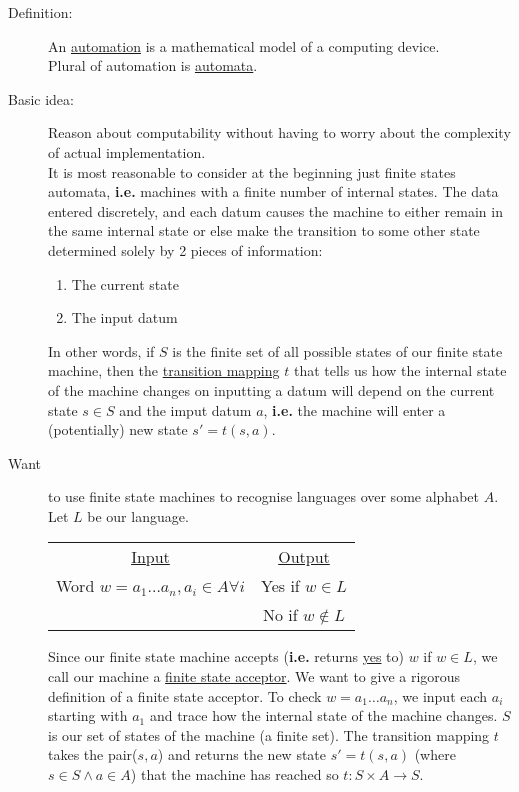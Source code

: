 \documentclass[10pt]{article}
\begin{document}
	\begin{description}
		\item[Definition:] An \underline{automation} is a mathematical model of a computing device. \\
		Plural of automation is \underline{automata}.
		\item[Basic idea:] Reason about computability without having to worry about the complexity of actual implementation. \\
		It is most reasonable to consider at the beginning just finite states automata, \textbf{i.e.} machines with a finite number of internal states. The data entered discretely, and each datum causes the machine to either remain in the same internal state or else make the transition to some other state determined solely by 2 pieces of information:
		\begin{enumerate}
			\item The current state
			\item The input datum
		\end{enumerate}
		In other words, if $S$ is the finite set of all possible states of our finite state machine, then the \underline{transition mapping} $t$ that tells us how the internal state of the machine changes on inputting a datum will depend on the current state $s \in S$ and the imput datum $a$, \textbf{i.e.} the machine will enter a (potentially) new state $s' = t(s, a)$.
		\item[Want] to use finite state machines to recognise languages over some alphabet $A$. Let $L$ be our language.\\
		\begin{table}[h!]
			\centering
			\begin{tabular}{cc}
				\underline{Input} & \underline{Output} \\
				Word $w=a_1\dots a_n, a_i \in A \forall i$ & Yes if $w \in L$ \\
				& No if $w \notin L$
			\end{tabular}
		\end{table}
		Since our finite state machine accepts (\textbf{i.e.} returns \underline{yes} to) $w$ if $w \in L$, we call our machine a \underline{finite state acceptor}. We want to give a rigorous definition of a finite state acceptor. To check $w=a_1 \dots a_n$, we input each $a_i$ starting with $a_1$ and trace how the internal state of the machine changes. $S$ is our set of states of the machine (a finite set). The transition mapping $t$ takes the pair($s, a$) and returns the new state $s'=t(s, a)$ (where $s \in S \land a \in A$) that the machine has reached so $t: S \times A \rightarrow S$. \\

\end{description}
\end{document}
